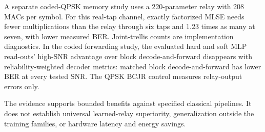 A separate coded-QPSK memory study uses a 220-parameter relay with 208 MACs per symbol. For this real-tap channel, exactly factorized MLSE needs fewer multiplications than the relay through six taps and 1.23 times as many at seven, with lower measured BER. Joint-trellis counts are implementation diagnostics. In the coded forwarding study, the evaluated hard and soft MLP read-outs' high-SNR advantage over block decode-and-forward disappears with reliability-weighted decoder metrics: matched block decode-and-forward has lower BER at every tested SNR. The QPSK BCJR control measures relay-output errors only.

The evidence supports bounded benefits against specified classical pipelines. It does not establish universal learned-relay superiority, generalization outside the training families, or hardware latency and energy savings.

